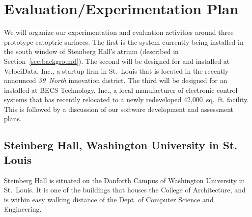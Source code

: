 \section{Evaluation/Experimentation Plan}
\label{sec:eval}

We will organize our experimentation and evaluation activities around
three prototype catoptric surfaces.  The first is the system currently
being installed in the south window of Steinberg Hall's atrium (described
in Section~\ref{sec:background}).
The second will be designed for and installed at VelociData, Inc.,
a startup firm in
St.~Louis that is located in the recently announced \emph{39~North}
innovation district.
The third will be designed for an installed at BECS Technology, Inc.,
a local manufacturer of electronic control systems that has recently
relocated to a newly redeveloped 42,000~sq.~ft. facility. 
This is followed by a discussion of our software development
and assessment plans.

\subsection{Steinberg Hall, Washington University in St. Louis}

Steinberg Hall is situated on the Danforth Campus of Washington University
in St.~Louis. It is one of the buildings that houses the College
of Architecture, and is within easy walking distance of the Dept. of
Computer Science and Engineering.

